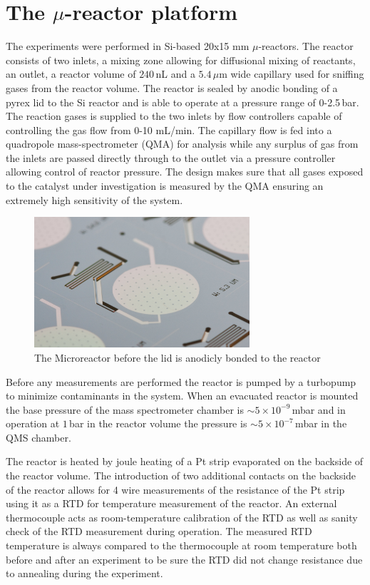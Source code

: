 \documentclass[8.5pt,twoside,twocolumn]{article}
\begin{document}
\section{The $\mu$-reactor platform}
The experiments were performed in Si-based 20x15 mm $\mu$-reactors\cite{Henriksen2009}. The reactor consists of two inlets, a mixing zone allowing for diffusional mixing of reactants, an outlet, a reactor volume of $240\,$nL and a $5.4\,\mu$m wide capillary used for sniffing gases from the reactor volume. The reactor is sealed by anodic bonding of a pyrex lid to the Si reactor and is able to operate at a pressure range of 0-2.5\,bar. The reaction gases is supplied to the two inlets by flow controllers capable of controlling the gas flow from 0-10 mL/min. The capillary flow is fed into a quadropole mass-spectrometer (QMA) for analysis while any surplus of gas from the inlets are passed directly through to the outlet via a pressure controller allowing control of reactor pressure. The design makes sure that all gases exposed to the catalyst under investigation is measured by the QMA ensuring an extremely high sensitivity of the system. 

\begin{figure}[h]
  \centering
  \includegraphics[width=8cm]{reactor.jpg}
  \caption{The Microreactor before the lid is anodicly bonded to the reactor}
  \label{fgr:reactor}
\end{figure}


Before any measurements are performed the reactor is pumped by a turbopump to minimize contaminants in the system. When an evacuated reactor is mounted the base pressure of the mass spectrometer chamber is $\sim5\times10^{-9}\,$mbar and in operation at $1\,$bar in the reactor volume the pressure is $\sim5\times10^{-7}\,$mbar in the QMS chamber. 

The reactor is heated by joule heating of a Pt strip evaporated on the backside of the reactor volume. The introduction of two additional contacts on the backside of the reactor allows for 4 wire measurements of the resistance of the Pt strip using it as a RTD for temperature measurement of the reactor. An external thermocouple acts as room-temperature calibration of the RTD as well as sanity check of the RTD measurement during operation. The measured RTD temperature is always compared to the thermocouple at room temperature both before and after an experiment to be sure the RTD did not change resistance due to annealing during the experiment.
\end{document}
